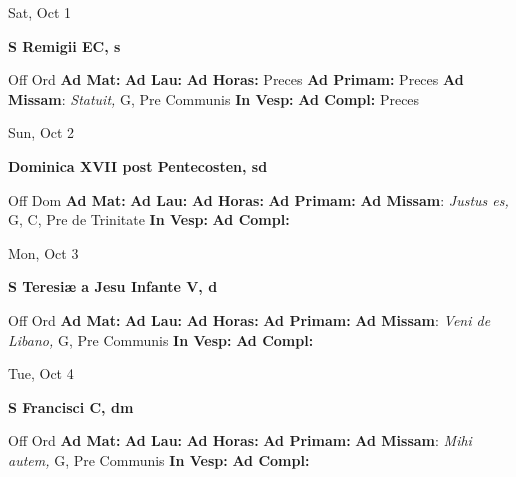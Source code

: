 \documentclass[10pt]{article}
\begin{document}
\begin{minipage}{3.5in}
\vspace{2em}\begin{center}
Sat, Oct 1
\end{center}\textbf{ \large S Remigii EC, \textnormal{\normalsize s}}
\begin{justify}
Off Ord
\textbf{Ad Mat: }
\textbf{Ad Lau: }
\textbf{Ad Horas: }Preces
\textbf{Ad Primam: }Preces
\textbf{Ad Missam}: \textit{Statuit,} G, Pre Communis
\textbf{In Vesp: }
\textbf{Ad Compl: }Preces\end{justify}
\end{minipage}



\begin{minipage}{3.5in}
\vspace{2em}\begin{center}
Sun, Oct 2
\end{center}\textbf{ \large Dominica XVII post Pentecosten, \textnormal{\normalsize sd}}
\begin{justify}
Off Dom
\textbf{Ad Mat: }
\textbf{Ad Lau: }
\textbf{Ad Horas: }
\textbf{Ad Primam: }
\textbf{Ad Missam}: \textit{Justus es,} G, C, Pre de Trinitate
\textbf{In Vesp: }
\textbf{Ad Compl: }\end{justify}
\end{minipage}



\begin{minipage}{3.5in}
\vspace{2em}\begin{center}
Mon, Oct 3
\end{center}\textbf{ \large S Teresiæ a Jesu Infante V, \textnormal{\normalsize d}}
\begin{justify}
Off Ord
\textbf{Ad Mat: }
\textbf{Ad Lau: }
\textbf{Ad Horas: }
\textbf{Ad Primam: }
\textbf{Ad Missam}: \textit{Veni de Libano,} G, Pre Communis
\textbf{In Vesp: }
\textbf{Ad Compl: }\end{justify}
\end{minipage}



\begin{minipage}{3.5in}
\vspace{2em}\begin{center}
Tue, Oct 4
\end{center}\textbf{ \large S Francisci C, \textnormal{\normalsize dm}}
\begin{justify}
Off Ord
\textbf{Ad Mat: }
\textbf{Ad Lau: }
\textbf{Ad Horas: }
\textbf{Ad Primam: }
\textbf{Ad Missam}: \textit{Mihi autem,} G, Pre Communis
\textbf{In Vesp: }
\textbf{Ad Compl: }\end{justify}
\end{minipage}
\end{document}
